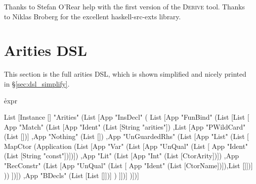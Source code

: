 \documentclass[preprint,draft]{sigplanconf}
\newcommand{\derive}{\textsc{Derive}}
\begin{document}
Thanks to Stefan O'Rear help with the first version of the \derive{} tool. Thanks to Niklas Broberg for the excellent haskell-src-exts library.


\appendix

\section{Arities DSL}
\label{sec:arities_full}

This section is the full arities DSL, which is shown simplified and nicely printed in \S\ref{sec:dsl_simplify}.

\h{expr}\begin{code}
List [Instance [] "Arities" (List [App "InsDecl" (
    List [App "FunBind" (List [List [
        App "Match" (List
            [App "Ident" (List [String "arities"])
            ,List [App "PWildCard" (List [])]
            ,App "Nothing" (List [])
            ,App "UnGuardedRhs" (List [App "List" (List [
                MapCtor (Application (List
                    [App "Var" (List [App "UnQual" (List [
                        App "Ident" (List [String "const"])])])
                    ,App "Lit" (List [App "Int" (List [CtorArity])])
                    ,App "RecConstr" (List [App "UnQual" (List [
                        App "Ident" (List [CtorName])]),List []])]
                ))
            ])])
            ,App "BDecls" (List [List []])]
        )
    ]])]
)])]
\end{code}



\end{document}
